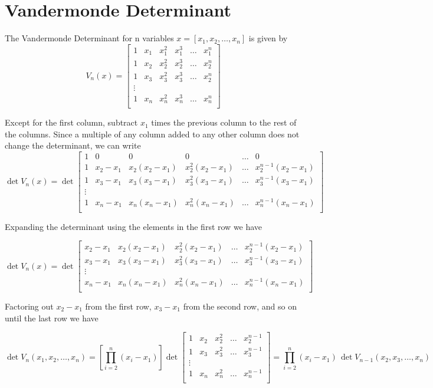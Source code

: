 \section{Vandermonde Determinant}

The Vandermonde Determinant for n variables $x = [x_1, x_2, \hdots, x_n]$ is given by 
$$V_n(x) =  
\begin{bmatrix}
1 & x_1 & x_1^2 &  x_1^3 & \hdots & x_1^n \\
1 & x_2 & x_2^2 &  x_2^3 &\hdots &x_2^n \\
1 &  x_3 & x_3^2 & x_3^3 &\hdots & x_2^n \\
\vdots \\
1 & x_n & x_n^2 & x_n^3 &\hdots & x_n^n \\
\end{bmatrix}
$$

Except for the first column, subtract $x_1$ times the previous column to the rest of the columns. Since a multiple of any column added to any other column does not change the determinant, we can write
$$\det{V_n(x)} =  
\det{\begin{bmatrix}
1 & 0 & 0 & 0 & \hdots & 0 \\
1 & x_2 - x_1 & x_2(x_2 - x_1) & x_2^2(x_2 - x_1) & \hdots & x_2^{n-1}(x_2-x_1) \\
1 &  x_3 -x_1 & x_3(x_3 - x_1) & x_3^2(x_3 - x_1) & \hdots & x_3^{n-1}(x_3-x_1) \\
\vdots \\
1 & x_n-x_1 & x_n(x_n - x_1) & x_n^2(x_n - x_1) & \hdots & x_n^{n-1}(x_n-x_1) \\
\end{bmatrix}}
$$

Expanding the determinant using the elements in the first row we have

$$\det{V_n(x)} =  
\det{\begin{bmatrix}
x_2 - x_1 & x_2(x_2 - x_1) & x_2^2(x_2 - x_1) & \hdots & x_2^{n-1}(x_2-x_1) \\
x_3 -x_1 & x_3(x_3 - x_1) & x_3^2(x_3 - x_1) & \hdots & x_3^{n-1}(x_3-x_1) \\
\vdots \\
x_n-x_1 & x_n(x_n - x_1) & x_n^2(x_n - x_1) & \hdots & x_n^{n-1}(x_n-x_1) \\
\end{bmatrix}}
$$

Factoring out $x_2-x_1$ from the first row, $x_3-x_1$ from the second row, and so on until the last row we have

$$\det{V_n(x_1,x_2,\hdots,x_n)} =  
[\prod_{i = 2}^n (x_i - x_1)] 
\det{\begin{bmatrix}
1 & x_2  & x_2^2 & \hdots & x_2^{n-1} \\
1 & x_3  & x_3^2 & \hdots & x_3^{n-1} \\
\vdots \\
1 & x_n & x_n^2 & \hdots & x_n^{n-1} \\
\end{bmatrix} }=
\prod_{i = 2}^n (x_i - x_1) \, \det{V_{n-1}(x_2,x_3,\hdots,x_n)}
$$
 
